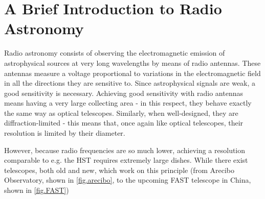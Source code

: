 

%
%

\section{A Brief Introduction to Radio Astronomy}
\pg
Radio astronomy consists of observing the electromagnetic emission of astrophysical sources at very long wavelengths by means of radio antennas. These antennas measure a voltage proportional to variations in the electromagnetic field in all the directions they are sensitive to. Since astrophysical signals are weak, a good sensitivity is necessary. Achieving good sensitivity with radio antennas means having a very large collecting area - in this respect, they behave exactly the same way as optical telescopes. Similarly, when well-designed, they are diffraction-limited - this means that, once again like optical telescopes, their resolution is limited by their diameter.

\pg
However, because radio frequencies are so much lower, achieving a resolution comparable to e.g. the HST requires extremely large dishes. While there exist telescopes, both old and new, which work on this principle (from Arecibo Observatory, shown in \cref{fig.arecibo}, to the upcoming FAST telescope in China, shown in \cref{fig.FAST})

